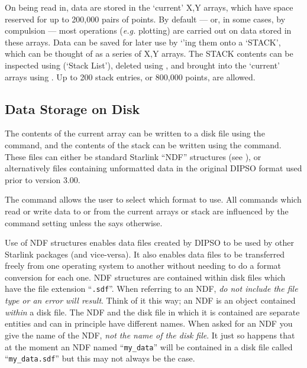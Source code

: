 \documentclass[twoside,11pt,noabs,nolof]{starlink}
\begin{document}
On being read in, data are stored in the `current' X,Y arrays, which have
space reserved for up to 200,000 pairs of points. By default --- or, in
some cases, by compulsion --- most operations (\emph{e.g.} plotting) are
carried out on data stored in these arrays. Data can be saved for later
use by `'ing  them onto a `STACK', which can
be thought of as a series of X,Y arrays. The STACK contents can be
inspected using   (`Stack List'), deleted using
,  and brought into the `current' arrays using
.  Up to 200 stack entries, or 800,000 points,
are allowed.

\subsection{Data Storage on Disk}

The contents of the current array can be written to a disk file using the
  command, and the contents of the stack
can be written using the   command. These
files can either be standard Starlink ``NDF'' structures (see
), or alternatively files containing unformatted data
in the original DIPSO format used prior to version 3.00.

The   command allows the user to select
which format to use. All commands which read or write data to or from the
current arrays or stack are influenced by the  command setting unless the  says otherwise.

Use of NDF structures enables data files created by DIPSO to be used by
other Starlink packages (and vice-versa). It also enables data files to
be transferred freely from one operating system to another without
needing to do a format conversion for each one. NDF structures are
contained within disk files which have the file extension ``{\texttt{.sdf}}''.
When referring to an NDF, \emph{do not include the file type or an error
will result}. Think of it this way; an NDF is an object contained \emph{within} a disk file. The NDF and the disk file in which it is contained
are separate entities and can in principle have different names. When
asked for an NDF you give the name of the NDF, \emph{not the name of the
disk file}. It just so happens that at the moment an NDF named
``{\texttt{my\_data}}''  will be contained in a disk file called
``{\texttt{my\_data.sdf}}''  but this may not always be the case.
\end{document}

